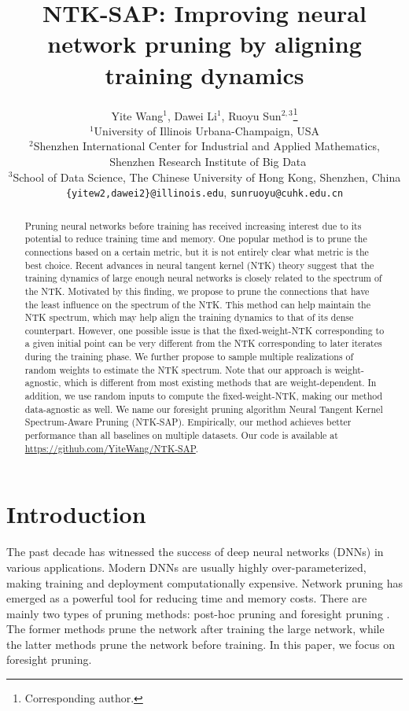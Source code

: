 \documentclass{article} %
\title{NTK-SAP: Improving neural network pruning by aligning training dynamics}
\author{Yite Wang$^1$, Dawei Li$^1$, Ruoyu Sun$^{2,3}$\thanks{Corresponding author.}  \\
$^1$University of Illinois Urbana-Champaign, USA\\ 
$^2$Shenzhen International Center for Industrial and Applied Mathematics,
  \\ $ \;  $ Shenzhen Research Institute of Big Data\\ 
$^3$School of Data Science, The Chinese  University of Hong Kong, Shenzhen, China  \\
\texttt{\{yitew2,dawei2\}@illinois.edu}, \texttt{sunruoyu@cuhk.edu.cn}  \\
}
\begin{document}
\maketitle

\begin{abstract}
Pruning neural networks before training has received increasing interest due to its potential to reduce training time and memory. One popular method is to prune the connections based on a  certain metric, but it is not entirely clear what metric is the best choice. Recent advances in neural tangent kernel (NTK) theory suggest that the training dynamics of large enough neural networks is closely related to the spectrum of the NTK. Motivated by this finding, we propose to prune the connections that have the least influence on the spectrum of the NTK. This method can help maintain the NTK spectrum, which may help align the training dynamics to that of its dense counterpart. However, one possible issue is that the fixed-weight-NTK corresponding to a given initial point can be very different from the NTK corresponding to later iterates during the training phase. We further propose to sample multiple realizations of random weights to estimate the NTK spectrum. Note that our approach is weight-agnostic, which is different from most existing methods that are weight-dependent. In addition, we use random inputs to compute the fixed-weight-NTK, making our method data-agnostic as well. We name our foresight pruning algorithm Neural Tangent Kernel Spectrum-Aware Pruning (NTK-SAP). Empirically, our method achieves better performance than all baselines on multiple datasets. Our code is available at \url{https://github.com/YiteWang/NTK-SAP}.
\end{abstract}


\section{Introduction}

The past decade has witnessed the success of deep neural networks (DNNs) in various applications. Modern DNNs are usually highly over-parameterized, making training and deployment computationally expensive. Network pruning has emerged as a powerful tool for reducing time and memory costs. There are mainly two  types of  pruning methods: post-hoc pruning \citep{han2015,LTR,molchanov2019importance, OBD, OBS} and foresight pruning \citep{snip, grasp, alizadeh2022prospect, synflow, force, NTT}. The former methods prune the network after training the large network, while the latter methods prune the network before training. In this paper, we focus on foresight pruning. 
\end{document}
